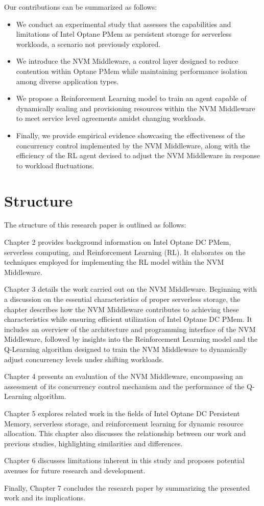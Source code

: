 Our contributions can be summarized as follows:

\begin{itemize}
    \item We conduct an experimental study that assesses the capabilities and limitations of Intel Optane PMem as persistent storage for serverless workloads, a scenario not previously explored.
    \item We introduce the NVM Middleware, a control layer designed to reduce contention within Optane PMem while maintaining performance isolation among diverse application types.
    \item We propose a Reinforcement Learning model to train an agent capable of dynamically scaling and provisioning resources within the NVM Middleware to meet service level agreements amidst changing workloads.
    \item Finally, we provide empirical evidence showcasing the effectiveness of the concurrency control implemented by the NVM Middleware, along with the efficiency of the RL agent devised to adjust the NVM Middleware in response to workload fluctuations.
\end{itemize}

\section{Structure}

The structure of this research paper is outlined as follows:

Chapter 2 provides background information on Intel Optane DC PMem, serverless computing, and Reinforcement Learning (RL). It elaborates on the techniques employed for implementing the RL model within the NVM Middleware.

Chapter 3 details the work carried out on the NVM Middleware. Beginning with a discussion on the essential characteristics of proper serverless storage, the chapter describes how the NVM Middleware contributes to achieving these characteristics while ensuring efficient utilization of Intel Optane DC PMem. It includes an overview of the architecture and programming interface of the NVM Middleware, followed by insights into the Reinforcement Learning model and the Q-Learning algorithm designed to train the NVM Middleware to dynamically adjust concurrency levels under shifting workloads.

Chapter 4 presents an evaluation of the NVM Middleware, encompassing an assessment of its concurrency control mechanism and the performance of the Q-Learning algorithm.

Chapter 5 explores related work in the fields of Intel Optane DC Persistent Memory, serverless storage, and reinforcement learning for dynamic resource allocation. This chapter also discusses the relationship between our work and previous studies, highlighting similarities and differences.

Chapter 6 discusses limitations inherent in this study and proposes potential avenues for future research and development.

Finally, Chapter 7 concludes the research paper by summarizing the presented work and its implications.